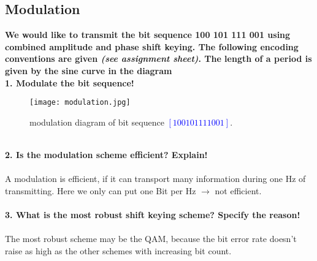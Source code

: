 \documentclass[a4paper,12pt]{article}
\begin{document}
\subsection{Modulation}
\textbf{We would like to transmit the bit sequence 100 101 111 001 using combined amplitude and phase shift keying.  The following encoding conventions are given \textit{(see assignment sheet)}. The length of a period is given by the sine curve in the diagram\\
1.  Modulate the bit sequence!}
\begin{figure}[h!]
	\centering
	\texttt{[image: modulation.jpg]} 
	\caption{modulation diagram of bit sequence \textcolor{blue}{$[100101111001]$}.}
\end{figure}
\\
\textbf{2.  Is the modulation scheme efficient?  Explain!}\\
\\
A modulation is efficient, if it can transport many information during one Hz of transmitting. Here we only can put one Bit per Hz $\rightarrow$ not efficient.\\
\\
\textbf{3.  What is the most robust shift keying scheme?  Specify the reason!}\\
\\
The most robust scheme may be the QAM, because the bit error rate doesn't raise as high as the other schemes with increasing bit count.
\end{document}
